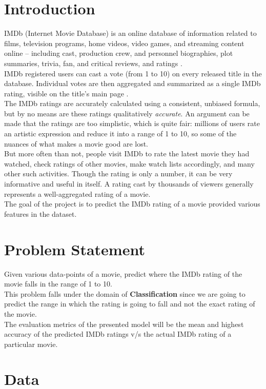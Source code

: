 \documentclass[conference]{IEEEtran}
\begin{document}
\section{Introduction}
IMDb (Internet Movie Database) is an online database of information related to films, television programs, home videos, video games, and streaming content online – including cast, production crew, and personnel biographies, plot summaries, trivia, fan, and critical reviews, and ratings \cite{IMDB}.\\
IMDb registered users can cast a vote (from 1 to 10) on every released title in the database. Individual votes are then aggregated and summarized as a single IMDb rating, visible on the title’s main page \cite{rating}.\\
The IMDb ratings are accurately calculated using a consistent, unbiased formula, but by no means are these ratings qualitatively \textit{accurate}. An argument can be made that the ratings are too simplistic, which is quite fair: millions of users rate an artistic expression and reduce it into a range of 1 to 10, so some of the nuances of what makes a movie good are lost. \\
But more often than not, people visit IMDb to rate the latest movie they had watched, check ratings of other movies, make watch lists accordingly, and many other such activities. Though the rating is only a number, it can be very informative and useful in itself. A rating cast by thousands of viewers generally represents a well-aggregated rating of a movie. \\
The goal of the project is to predict the IMDb rating of a movie provided various features in the dataset.
\section{Problem Statement}
Given various data-points of a movie, predict where the IMDb rating of the movie falls in the range of 1 to 10.\\
This problem falls under the domain of \textbf{Classification} since we are going to predict the range in which the rating is going to fall and not the exact rating of the movie.\\
The evaluation metrics of the presented model will be the mean and highest accuracy of the predicted IMDb ratings v/s the actual IMDb rating of a particular movie.\\
\newpage
\section{Data}
\end{document}
